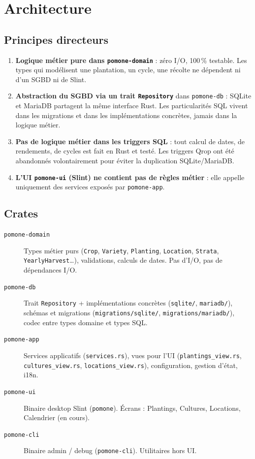 \section{Architecture}

\subsection{Principes directeurs}

\begin{enumerate}
  \item \textbf{Logique métier pure dans \texttt{pomone-domain}} : zéro I/O, 100\,\% testable. Les types qui modélisent une plantation, un cycle, une récolte ne dépendent ni d'un SGBD ni de Slint.
  \item \textbf{Abstraction du SGBD via un trait \texttt{Repository}} dans \texttt{pomone-db} : SQLite et MariaDB partagent la même interface Rust. Les particularités SQL vivent dans les migrations et dans les implémentations concrètes, jamais dans la logique métier.
  \item \textbf{Pas de logique métier dans les triggers SQL} : tout calcul de dates, de rendements, de cycles est fait en Rust et testé. Les triggers Qrop ont été abandonnés volontairement pour éviter la duplication SQLite/MariaDB.
  \item \textbf{L'UI \texttt{pomone-ui} (Slint) ne contient pas de règles métier} : elle appelle uniquement des services exposés par \texttt{pomone-app}.
\end{enumerate}

\subsection{Crates}

\begin{description}
  \item[\texttt{pomone-domain}] Types métier purs (\texttt{Crop}, \texttt{Variety}, \texttt{Planting}, \texttt{Location}, \texttt{Strata}, \texttt{YearlyHarvest}\dots), validations, calculs de dates. Pas d'I/O, pas de dépendances I/O.
  \item[\texttt{pomone-db}] Trait \texttt{Repository} + implémentations concrètes (\texttt{sqlite/}, \texttt{mariadb/}), schémas et migrations (\texttt{migrations/sqlite/}, \texttt{migrations/mariadb/}), codec entre types domaine et types SQL.
  \item[\texttt{pomone-app}] Services applicatifs (\texttt{services.rs}), vues pour l'UI (\texttt{plantings\_view.rs}, \texttt{cultures\_view.rs}, \texttt{locations\_view.rs}), configuration, gestion d'état, i18n.
  \item[\texttt{pomone-ui}] Binaire desktop Slint (\texttt{pomone}). Écrans : Plantings, Cultures, Locations, Calendrier (en cours).
  \item[\texttt{pomone-cli}] Binaire admin / debug (\texttt{pomone-cli}). Utilitaires hors UI.
\end{description}

